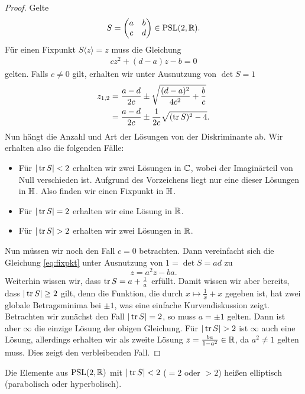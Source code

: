\begin{proof}
  Gelte
  \[
  S =
  \begin{pmatrix}
    a & b\\
    c & d
  \end{pmatrix} \in \operatorname{PSL}(2, \mathbb{R}).
  \]
  Für einen Fixpunkt $S \langle z \rangle = z$ muss die Gleichung
  \begin{align}
    \label{eq:fixpkt}
    c z^2 + (d-a)z - b = 0
  \end{align}
  gelten. Falls $c \neq 0$ gilt, erhalten wir unter Ausnutzung von $\det S = 1$
  \begin{align*}
    z_{1,2} & = \frac{a-d}{2c} \pm \sqrt{\frac{(d-a)^2}{4c^2} +
      \frac{b}{c}} \\
    & = \frac{a-d}{2c} \pm \frac{1}{2c} \sqrt{(\operatorname{tr} S)^2 - 4}.
  \end{align*}
  Nun hängt die Anzahl und Art der Lösungen von der Diskriminante
  ab. Wir erhalten also die folgenden Fälle:
  \begin{itemize}
  \item Für $|\operatorname{tr} S| < 2$ erhalten wir zwei Lösungen in $\mathbb{C}$, wobei
    der Imaginärteil von Null verschieden ist. Aufgrund des
    Vorzeichens liegt nur eine dieser Lösungen in $\mathbb{H}$. Also finden
    wir einen Fixpunkt in $\mathbb{H}$.
  \item Für $|\operatorname{tr} S| = 2$ erhalten wir eine Lösung in $\mathbb{R}$.
  \item Für $|\operatorname{tr} S| > 2$ erhalten wir zwei Lösungen in $\mathbb{R}$.
  \end{itemize}
  Nun müssen wir noch den Fall $c = 0$ betrachten. Dann vereinfacht
  sich die Gleichung \eqref{eq:fixpkt} unter Ausnutzung von $1 = \det
  S = ad$ zu
  \[
  z = a^2 z - ba.
  \]
  Weiterhin wissen wir, dass $\operatorname{tr} S = a + \frac{1}{a}$ erfüllt. Damit
  wissen wir aber bereits, dass $|\operatorname{tr} S| \geq 2$ gilt, denn die
  Funktion, die durch $x \mapsto \frac{1}{x} + x$ gegeben ist, hat
  zwei globale Betragsminima bei $\pm 1$, was eine einfache
  Kurvendiskussion zeigt. Betrachten wir zunächst den Fall $|\operatorname{tr} S| =
  2$, so muss $a = \pm 1$ gelten. Dann ist aber $\infty$ die einzige
  Lösung der obigen Gleichung. Für $|\operatorname{tr} S| > 2$ ist $\infty$ auch
  eine Lösung, allerdings erhalten wir als zweite Lösung $z =
  \frac{ba}{1-a^2} \in \mathbb{R}$, da $a^2 \neq 1$ gelten muss. Dies zeigt
  den verbleibenden Fall.
\end{proof}

\begin{defin}
  Die Elemente aus $\operatorname{PSL}(2,\mathbb{R})$ mit $|\operatorname{tr} S| < 2$ ($ = 2$ oder $ > 2$)
  heißen elliptisch (parabolisch oder hyperbolisch).
\end{defin}

